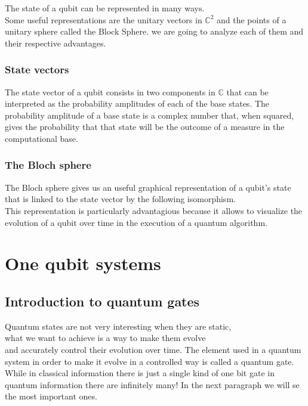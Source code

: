 \documentclass{article}
\begin{document}
The state of a qubit can be represented in many ways.\\
Some useful representations are the unitary vectors in $\mathbb{C}^2$
and the points of a unitary sphere called the Block Sphere.
we are going to analyze each of them and their respective advantages.

\subsubsection{State vectors}

The state vector of a qubit consists in two components in $\mathbb{C}$
that can be interpreted as the probability amplitudes of each of the
base states.
The probability amplitude of a base state is a complex number that,
when squared, gives the probability that that state will be the outcome
of a measure in the computational base. %

\subsubsection{The Bloch sphere}

The Bloch sphere gives us an useful graphical representation of a
qubit's state that is linked to the state vector by the following
isomorphism.\\
This representation is particularly advantagious because it allows
to visualize the evolution of a qubit over time in the execution
of a quantum algorithm.

\newpage

\section{One qubit systems}


\subsection{Introduction to quantum gates}
Quantum states are not very interesting when they are static, \\
what we want to achieve is a way to make them evolve\\
and accurately control their evolution over time.
The element used in a quantum system in order to make it evolve
in a controlled way is called a quantum gate.\\
While in classical information there is just a single kind of one bit
gate in quantum information there are infinitely many!
In the next paragraph we will se the most important ones.
\end{document}
